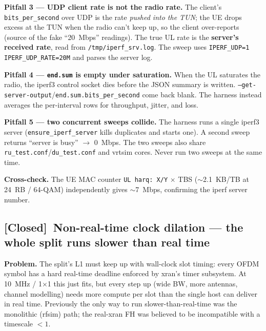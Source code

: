 \documentclass[11pt,a4paper]{article}
\newcommand{\closed}{\textcolor{closedcol}{\textbf{[Closed]}}}
\begin{document}
\textbf{Pitfall 3 --- UDP client rate is not the radio rate.}
The client's \texttt{bits\_per\_second} over UDP is the rate \emph{pushed into the TUN}; the
UE drops excess at the TUN when the radio can't keep up, so the client over-reports (source
of the fake ``20~Mbps'' readings). The true UL rate is the \textbf{server's received rate},
read from \texttt{/tmp/iperf\_srv.log}. The sweep uses \texttt{IPERF\_UDP=1
IPERF\_UDP\_RATE=20M} and parses the server log.

\textbf{Pitfall 4 --- \texttt{end.sum} is empty under saturation.}
When the UL saturates the radio, the iperf3 control socket dies before the JSON summary is
written. \texttt{--get-server-output}/\texttt{end.sum.bits\_per\_second} come back blank.
The harness instead averages the per-interval rows for throughput, jitter, and loss.

\textbf{Pitfall 5 --- two concurrent sweeps collide.}
The harness runs a single iperf3 server (\texttt{ensure\_iperf\_server} kills duplicates and
starts one). A second sweep returns ``server is busy'' $\rightarrow$ 0~Mbps. The two sweeps
also share \texttt{ru\_test.conf}/\texttt{du\_test.conf} and vrtsim cores. Never run two
sweeps at the same time.

\textbf{Cross-check.} The UE MAC counter \texttt{UL harq: X/Y} $\times$ TBS
($\sim$2.1~KB/TB at 24~RB / 64-QAM) independently gives $\sim$7~Mbps, confirming the iperf
server number.

\subsection{\texorpdfstring{\closed}{[Closed]}\ Non-real-time clock dilation --- the whole split runs slower than real time}
\label{sec:nrt}

\textbf{Problem.} The split's L1 must keep up with wall-clock slot timing: every OFDM symbol
has a hard real-time deadline enforced by xran's timer subsystem. At 10~MHz / 1$\times$1 this
just fits, but every step up (wide BW, more antennas, channel modelling) needs more compute
per slot than the single host can deliver in real time. Previously the only way to run
slower-than-real-time was the monolithic (rfsim) path; the real-xran FH was believed to be
incompatible with a timescale $<1$.
\end{document}
